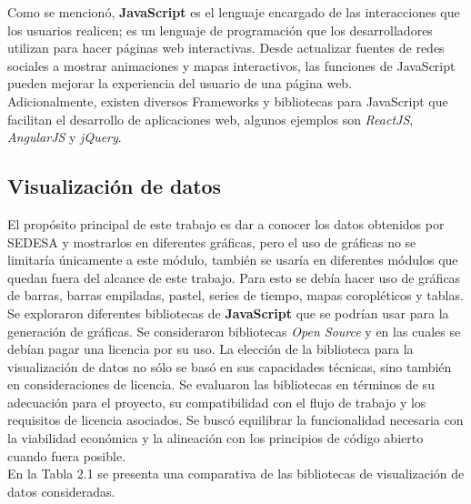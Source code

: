 Como se mencionó, \textbf{JavaScript} es el lenguaje encargado de las interacciones que los usuarios realicen; es un lenguaje de programación que los desarrolladores utilizan para hacer páginas web interactivas. Desde actualizar fuentes de redes sociales a mostrar animaciones y mapas interactivos, las funciones de JavaScript pueden mejorar la experiencia del usuario de una página web.\\
Adicionalmente, existen diversos Frameworks y bibliotecas para JavaScript que facilitan el desarrollo de aplicaciones web, algunos ejemplos son \textit{ReactJS}, \textit{AngularJS} y \textit{jQuery}.

\subsection{Visualización de datos}

El propósito principal de este trabajo es dar a conocer los datos obtenidos por SEDESA y mostrarlos en diferentes gráficas, pero el uso de gráficas no se limitaría únicamente a este módulo, también se usaría en diferentes módulos que quedan fuera del alcance de este trabajo. Para esto se debía hacer uso de gráficas de barras, barras empiladas, pastel, series de tiempo, mapas coropléticos y tablas.\\

Se exploraron diferentes bibliotecas de \textbf{JavaScript} que se podrían usar para la generación de gráficas. Se consideraron bibliotecas \textit{Open Source} y en las cuales se debían pagar una licencia por su uso.
La elección de la biblioteca para la visualización de datos no sólo se basó en sus capacidades técnicas, sino también en consideraciones de licencia. Se evaluaron las bibliotecas en términos de su adecuación para el proyecto, su compatibilidad con el flujo de trabajo y los requisitos de licencia asociados. Se buscó equilibrar la funcionalidad necesaria con la viabilidad económica y la alineación con los principios de código abierto cuando fuera posible.\\
En la Tabla 2.1 se presenta una comparativa de las bibliotecas de visualización de datos consideradas.\\

